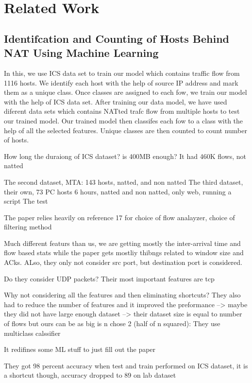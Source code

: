 \section{Related Work}\label{sec:related}

\subsection{Identifcation and Counting of Hosts Behind NAT Using Machine
Learning \cite{shukla2022identification}}
In this, we use ICS data set to train our model which contains traffic flow from 1116 hosts. We identify each host with
the help of source IP address and mark them as a unique
class. Once classes are assigned to each fow, we train our
model with the help of ICS data set. After training our data
model, we have used diferent data sets which contains NATted trafc flow from multiple hosts to test our trained model.
Our trained model then classifes each fow to a class with
the help of all the selected features. Unique classes are then
counted to count number of hosts.

How long the duraiong of ICS dataset? is 400MB enough? It had 460K flows, not natted

The second dataset, MTA: 143 hosts, natted, and non natted
The third dataset, their own, 73 PC hosts 6 hours, natted and non natted, only web, running a script 
The test 

The paper relies heavily on reference 17 for choice of flow analayzer, choice of filtering method 

Much different featurs than us, we are getting mostly the inter-arrival time and flow based stats while the paper gets mostliy thibngs related to window size and ACks. 
ALso, they only not consider src port, but destination port is considered. 

Do they consider UDP packets? Their most important features are tcp

Why not considering all the features and then eliminating shortcuts?
They also had to reduce the number of features and it improved the preformance --> maybe they did not have large enough dataset --> their dataset size is equal to number of flows but ours can be as big is n chose 2 (half of n squared): They use multiclass calssifier 

It redifines some ML stuff to just fill out the paper 

They got 98 percent accuracy when test and train performed on ICS dataset, it is a shortcut though, accuracy dropped to 89 on lab dataset 




